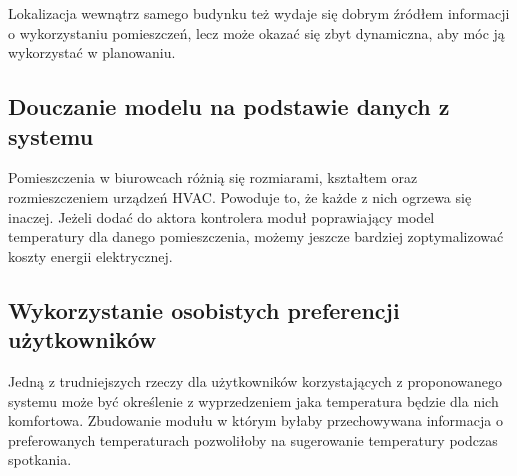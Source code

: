 Lokalizacja wewnątrz samego budynku też wydaje się dobrym źródłem informacji o wykorzystaniu pomieszczeń, lecz może okazać się zbyt dynamiczna, aby móc ją wykorzystać w planowaniu.

\subsection*{Douczanie modelu na podstawie danych z systemu}
Pomieszczenia w biurowcach różnią się rozmiarami, kształtem oraz rozmieszczeniem urządzeń HVAC. Powoduje to, że każde z nich ogrzewa się inaczej. Jeżeli dodać do aktora kontrolera moduł poprawiający model temperatury dla danego pomieszczenia, możemy jeszcze bardziej zoptymalizować koszty energii elektrycznej.

\subsection*{Wykorzystanie osobistych preferencji użytkowników}
Jedną z trudniejszych rzeczy dla użytkowników korzystających z proponowanego systemu może być określenie z wyprzedzeniem jaka temperatura będzie dla nich komfortowa.
Zbudowanie modułu w którym byłaby przechowywana informacja o preferowanych temperaturach pozwoliłoby na sugerowanie temperatury podczas spotkania. 